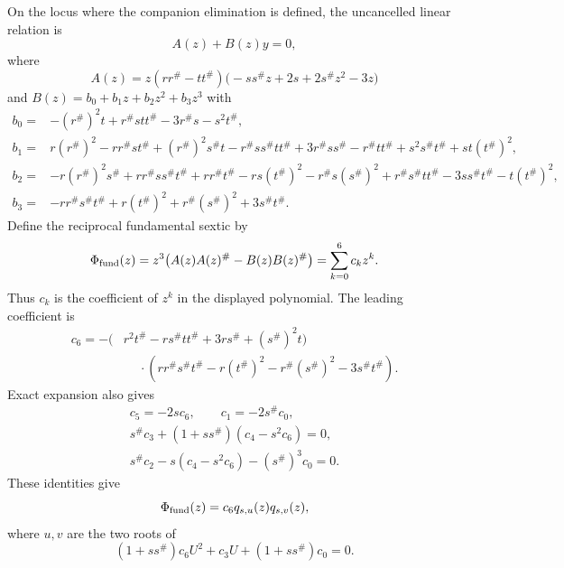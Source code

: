 On the locus where the companion elimination is defined, the uncancelled linear relation is
\begin{equation}
A(z)+B(z)y=0,
\label{eq:supp-companion-linear}
\end{equation}
where
\begin{equation}
A(z)=z(rr^\#-tt^\#)
\bigl(-ss^\#z+2s+2s^\#z^2-3z\bigr)
\label{eq:supp-A-explicit}
\end{equation}
and $B(z)=b_0+b_1z+b_2z^2+b_3z^3$ with
\begin{equation}
\begin{aligned}
b_0={}&-(r^\#)^2t+r^\#stt^\#-3r^\#s-s^2t^\#,
\\
b_1={}&r(r^\#)^2-rr^\#st^\#+(r^\#)^2s^\#t
-r^\#ss^\#tt^\#+3r^\#ss^\#-r^\#tt^\#
+s^2s^\#t^\#+st(t^\#)^2,
\\
b_2={}&-r(r^\#)^2s^\#+rr^\#ss^\#t^\#+rr^\#t^\#
-rs(t^\#)^2-r^\#s(s^\#)^2+r^\#s^\#tt^\#
-3ss^\#t^\#-t(t^\#)^2,
\\
b_3={}&-rr^\#s^\#t^\#+r(t^\#)^2+r^\#(s^\#)^2+3s^\#t^\#.
\label{eq:supp-B-explicit}
\end{aligned}
\end{equation}
Define the reciprocal fundamental sextic by
\begin{equation}
\Phi_{\rm fund}(z)=z^3\bigl(A(z)A(z)^\#-B(z)B(z)^\#\bigr)
=\sum_{k=0}^{6}c_kz^k.
\label{eq:supp-fundamental-sextic}
\end{equation}
Thus $c_k$ is the coefficient of $z^k$ in the displayed polynomial.  The leading coefficient is
\begin{equation}
\begin{aligned}
c_6=-(&r^2t^\#-rs^\#tt^\#+3rs^\#+(s^\#)^2t)\\
&\mathrel{\phantom{-}}\cdot
(rr^\#s^\#t^\#-r(t^\#)^2-r^\#(s^\#)^2-3s^\#t^\#).
\end{aligned}
\label{eq:supp-c6-explicit}
\end{equation}
Exact expansion also gives
\begin{equation}
\begin{gathered}
c_5=-2sc_6,\qquad c_1=-2s^\#c_0,\\
s^\#c_3+(1+ss^\#)(c_4-s^2c_6)=0,\\
s^\#c_2-s(c_4-s^2c_6)-(s^\#)^3c_0=0.
\end{gathered}
\label{eq:supp-coefficient-identities}
\end{equation}
These identities give
\begin{equation}
\Phi_{\rm fund}(z)=c_6q_{s,u}(z)q_{s,v}(z),
\label{eq:supp-sextic-factor}
\end{equation}
where $u,v$ are the two roots of
\begin{equation}
(1+ss^\#)c_6U^2+c_3U+(1+ss^\#)c_0=0.
\label{eq:supp-product-quadratic}
\end{equation}

